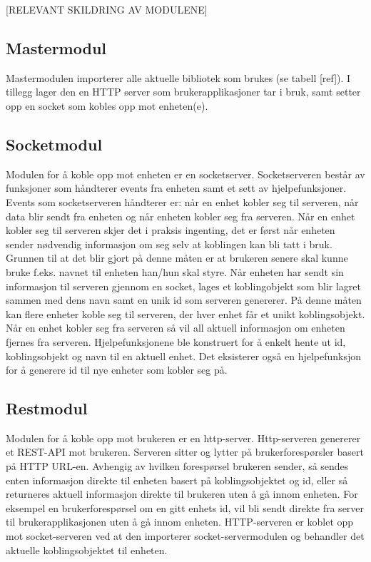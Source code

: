 \documentclass[12pt]{report}
\begin{document}
[RELEVANT SKILDRING AV MODULENE]

\subsection{Mastermodul}
Mastermodulen importerer alle aktuelle bibliotek som brukes (se tabell [ref]). I tillegg lager den en HTTP server som brukerapplikasjoner tar i bruk, samt setter opp en socket som kobles opp mot enheten(e).

\subsection{Socketmodul}
Modulen for å koble opp mot enheten er en socketserver. Socketserveren består av funksjoner som håndterer events fra enheten samt et sett av hjelpefunksjoner. Events som socketserveren håndterer er: når en enhet kobler seg til serveren, når data blir sendt fra enheten og når enheten kobler seg fra serveren. Når en enhet kobler seg til serveren skjer det i praksis ingenting, det er først når enheten sender nødvendig informasjon om seg selv at koblingen kan bli tatt i bruk. Grunnen til at det blir gjort på denne måten er at brukeren senere skal kunne bruke f.eks. navnet til enheten han/hun skal styre. Når enheten har sendt sin informasjon til serveren gjennom en socket, lages et koblingobjekt som blir lagret sammen med dens navn samt en unik id som serveren genererer. På denne måten kan flere enheter koble seg til serveren, der hver enhet får et unikt koblingsobjekt. Når en enhet kobler seg fra serveren så vil all aktuell informasjon om enheten fjernes fra serveren. Hjelpefunksjonene ble konstruert for å enkelt hente ut id, koblingsobjekt og navn til en aktuell enhet. Det eksisterer også en hjelpefunksjon for å generere id til nye enheter som kobler seg på. 

\subsection{Restmodul}
Modulen for å koble opp mot brukeren er en http-server. Http-serveren genererer et REST-API mot brukeren. Serveren sitter og lytter på brukerforespørsler basert på HTTP URL-en. Avhengig av hvilken forespørsel brukeren sender, så sendes enten informasjon direkte til enheten basert på koblingsobjektet og id, eller så returneres aktuell informasjon direkte til brukeren uten å gå innom enheten. For eksempel en brukerforespørsel om en gitt enhets id, vil bli sendt direkte fra server til brukerapplikasjonen uten å gå innom enheten. HTTP-serveren er koblet opp mot socket-serveren ved at	den importerer socket-servermodulen og behandler det aktuelle koblingsobjektet til enheten.
\end{document}
